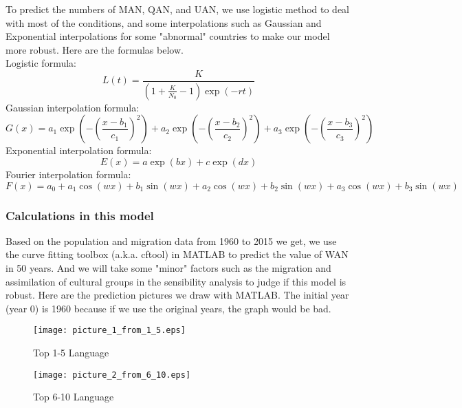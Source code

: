 \documentclass{mcmthesis}
\begin{document}
To predict the numbers of MAN, QAN, and UAN, we use logistic method to deal with most of the conditions, and some interpolations such as Gaussian and Exponential interpolations for some "abnormal" countries to make our model more robust. Here are the formulas below.\\
Logistic formula:
\begin{equation}
L(t)=\frac{K}{(1+\frac{K}{N_0}-1)\exp(-rt)}
\end{equation}
Gaussian interpolation formula:
\begin{equation}
G(x)=a_1\exp(-(\frac{x-b_1}{c_1})^2)+a_2\exp(-(\frac{x-b_2}{c_2})^2)+a_3\exp(-(\frac{x-b_3}{c_3})^2)
\end{equation}
Exponential interpolation formula:
\begin{equation}
E(x)=a\exp(bx) + c\exp(dx)
\end{equation}
Fourier interpolation formula:
\begin{equation}
F(x)=a_0+a_1\cos(wx)+b_1\sin(wx)+a_2\cos(wx)+b_2\sin(wx)+a_3\cos(wx)+b_3\sin(wx)
\end{equation}

\subsubsection{Calculations in this model}
\hspace*{8mm}Based on the population and migration data from 1960 to 2015 we get, we use the curve fitting toolbox (a.k.a. cftool) in MATLAB to predict the value of WAN in 50 years. And we will take some "minor" factors such as the migration and assimilation of cultural groups in the sensibility analysis to judge if this model is robust. Here are the prediction pictures we draw with MATLAB. The initial year (year 0) is 1960 because if we use the original years, the graph would be bad.

\begin{figure}[h]
\small
\centering
\texttt{[image: picture\_1\_from\_1\_5.eps]}
\caption{Top 1-5 Language} \label{fig:Top 1-5 Language}
\end{figure}

\begin{figure}[h]
\small
\centering
\texttt{[image: picture\_2\_from\_6\_10.eps]}
\caption{Top 6-10 Language} \label{fig:Top 6-10 Language}
\end{figure}
\end{document}
